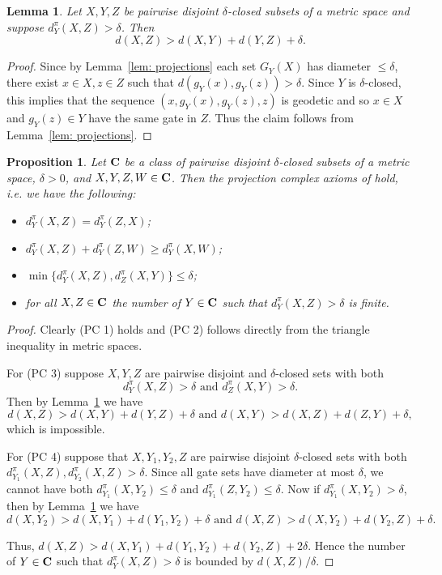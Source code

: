 \documentclass{amsart}
\renewcommand{\d}{\delta}
\newtheorem{lemma}[defi]{Lemma}
\newtheorem{proposition}[defi]{Proposition}
\begin{document}
\begin{lemma}\label{lem:closed sets between}
Let $X, Y, Z$  be pairwise disjoint   $\d$-closed subsets of a metric space and suppose  $d^\pi_Y (X, Z)> \d$. Then
\[d(X,Z)>d(X,Y)+d(Y,Z)+\d.\]
\end{lemma}
\begin{proof}
 Since by Lemma~\ref{lem: projections} each set $G_Y(X)$ has diameter $\leq \d$, there exist $x\in X, z\in Z$ such that $d(g_Y(x),g_Y(z))>\d$. Since $Y$ is   $\d$-closed, this implies that the sequence $(x,g_Y(x),g_Y(z),z)$ is geodetic and so $x\in X$ and $g_Y(z)\in Y$ have the same gate in $Z$. Thus the claim follows from  Lemma~\ref{lem: projections}.
\end{proof}


\begin{proposition}\label{prop:projection axioms}
Let $\bf{C}$ be a class of pairwise disjoint   $\d$-closed subsets of a metric space, $\d>0$, and $X, Y, Z, W\in \bf{C}$. Then the projection complex axioms of \cite{Bestvina}  hold, i.e. we have the following:

\begin{itemize}
\item[(PC 1)]  $d^\pi_Y (X, Z)=d^\pi_Y (Z, X)$;
\item[(PC 2)]  $d^\pi_Y (X, Z)+ d^\pi_Y (Z, W)\geq d^\pi_Y (X, W)$;
\item[(PC 3)]  $\min\{d^\pi_Y (X, Z), d^\pi_Z (X, Y)\}\leq \d$;
\item[(PC 4)]  for all $X, Z\in\bf{C}$ the number of $Y\in\bf{C}$ such that $d^\pi_Y (X, Z)>\d$ is finite.
\end{itemize}
\end{proposition}
\begin{proof}
Clearly (PC 1) holds and (PC 2) follows directly from the triangle inequality in metric spaces.

For (PC 3) suppose $X, Y, Z$  are pairwise disjoint and   $\d$-closed sets with both 
\[d^\pi_Y (X, Z)>\d \mbox{\ and\ } d^\pi_Z (X, Y)> \d.\] Then by Lemma~\ref{lem:closed sets between} we have  \[d(X,Z)>d(X,Y)+d(Y,Z)+\d \mbox{\ and \ }d(X,Y)>d(X,Z)+d(Z,Y)+\d,\] which is impossible.

For (PC 4) suppose that $X, Y_1, Y_2, Z$  are pairwise disjoint   $\d$-closed sets with both $d^\pi_{Y_1} (X, Z), d^\pi_{Y_2} (X, Z)> \d$.
Since all gate sets have diameter at most $\d$, we cannot have both
$d^\pi_{Y_1}(X,Y_2)\leq \d$ and $d^\pi_{Y_1}(Z,Y_2)\leq \d$. Now if $d^\pi_{Y_1}(X,Y_2)> \d$, then by Lemma~\ref{lem:closed sets between} we have
\[d(X,Y_2)>d(X,Y_1)+d(Y_1,Y_2)+\d \mbox{ and } d(X,Z)>d(X,Y_2)+d(Y_2,Z)+\d.\]

Thus, $d(X,Z)>d(X,Y_1)+d(Y_1,Y_2)+d(Y_2,Z)+2\d$.
Hence the number of $Y\in\bf{C}$ such that $d^\pi_Y (X, Z)>\d$ is bounded by $d(X,Z)/\d$.
\end{proof}
\end{document}
